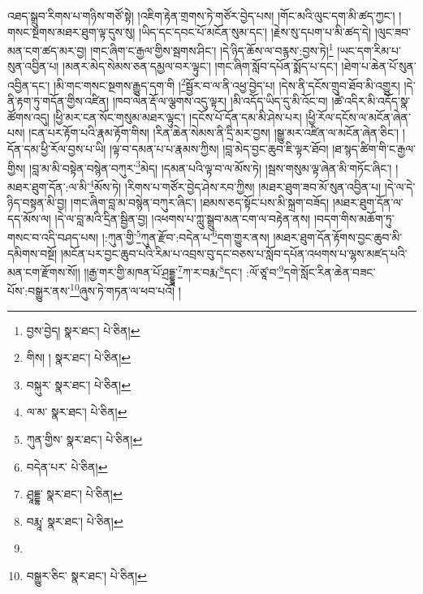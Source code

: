 འཐད་སྒྲུབ་རིགས་པ་གཉིས་གཙོ་སྟེ། །འཇིག་རྟེན་གྲགས་ཏེ་གཙོར་བྱེད་པས། །གོང་མའི་ལུང་དག་མི་ཚད་ཀྱང་། །གསང་སྔགས་མཐར་ཐུག་ལྟ་དུས་སུ། །ཡིད་དང་དབང་པོ་མངོན་སུམ་དང་། །རྗེས་སུ་དཔག་པ་མི་ཚད་དེ། །ལུང་ཟབ་མན་ངག་ཚད་མར་བྱ། །གང་ཞིག་ང་རྒྱལ་གྱིས་སྦགས་ཤིང་། །དེ་ཉིད་ཆོས་ལ་བརྙས་:བྱས་ཏེ།\footnote{བྱས་བྱེད།  སྣར་ཐང་།  པེ་ཅིན། } །ཡང་དག་རིམ་པ་སུན་འབྱིན་པ། །མནར་མེད་སེམས་ཅན་དམྱལ་བར་ལྟུང་། །གང་ཞིག་སློབ་དཔོན་སྨོད་པ་དང་། །ཐེག་པ་ཆེན་པོ་སུན་འབྱིན་དང་། །མི་གང་གསང་སྔགས་རྒྱུད་དག་གི །\footnote{གིས། །  སྣར་ཐང་།  པེ་ཅིན། }སྦྱོར་བ་ལ་ནི་འཕྱ་བྱེད་པ། །དེས་ནི་དངོས་གྲུབ་ཐོབ་མི་འགྱུར། །དེ་ནི་རྟག་ཏུ་གདོན་གྱིས་འཛིན། །ཁབ་ལེན་རྡོ་ལ་ལྕགས་འདུ་ལྟར། །མི་འདོད་ཡིད་དུ་མི་འོང་བ། །ཚེ་འདིར་མི་འདོད་སྣ་ཚོགས་འདུ། །ཕྱི་མར་ངན་སོང་གསུམ་མཐར་ལྟུང་། །དངོས་པོ་དོན་དམ་མི་ཤེས་པར། །ཕྱི་རོལ་དངོས་ལ་མངོན་ཞེན་པས། །ངན་པར་རྟོག་པའི་རྣམ་རྟོག་གིས། །རིན་ཆེན་སེམས་ནི་དྲི་མར་བྱས། །སྒྱུ་མར་འཛིན་ལ་མངོན་ཞེན་ཅིང་། །དོན་དམ་ཕྱི་རོལ་བྱས་པ་ཡི། །ལྟ་བ་དམན་པ་པ་རྣམས་ཀྱིས། །བླ་མེད་བྱང་ཆུབ་ཇི་ལྟར་ཐོབ། །ཐ་སྙད་ཚིག་གི་ང་རྒྱལ་གྱིས། །བླ་མ་མི་བསྟེན་བསྙེན་བཀུར་\footnote{བསྐུར་  སྣར་ཐང་།  པེ་ཅིན། }མེད། །དམན་པའི་ལྟ་བ་ལ་མོས་ཏེ། །སྦས་གསུམ་ལྟ་ཞེན་མི་གཏོང་ཞིང་། །མཐར་ཐུག་དོན་:ལ་མི་\footnote{ལ་མ་  སྣར་ཐང་།  པེ་ཅིན། }མོས་ཏེ། །རིགས་པ་གཙོར་བྱེད་ཤེས་རབ་ཀྱིས། །མཐར་ཐུག་ཟབ་མོ་སུན་འབྱིན་པ། །དེ་ལ་དེ་ཉིད་བསྟན་མི་བྱ། །གང་ཞིག་བླ་མ་བསྙེན་བཀུར་ཞིང་། །ཐམས་ཅད་སྟོང་པས་མི་སྐྲག་བཟོད། །མཐར་ཐུག་དོན་ལ་དད་མོས་ལ། །དེ་ལ་བླ་མའི་དྲིན་སྦྱིན་བྱ། །འཕགས་པ་ཀླུ་སྒྲུབ་མན་ངག་ལ་བརྟེན་ནས། །བདག་གིས་མཆོག་ཏུ་གསང་བ་འདི་བཤད་པས། །:ཀུན་གྱི་\footnote{ཀུན་གྱིས་  སྣར་ཐང་།  པེ་ཅིན། }ཀུན་རྫོབ་:བདེན་པ་\footnote{བདེན་པར་  པེ་ཅིན། }དག་གྱུར་ནས། །མཐར་ཐུག་དོན་རྟོགས་བྱང་ཆུབ་མི་དམིགས་བསྔོ། །མངོན་པར་བྱང་ཆུབ་པའི་རིམ་པ་འབྲས་བུ་དང་བཅས་པ་སློབ་དཔོན་འཕགས་པ་ལྷས་མཛད་པའི་མན་ངག་རྫོགས་སོ།། །།རྒྱ་གར་གྱི་མཁན་པོ་ཤྲདྡྷཱ་\footnote{ཤྲཱདྡྷ་  སྣར་ཐང་།  པེ་ཅིན། }ཀ་ར་བརྨ་\footnote{བརྨཱ་  སྣར་ཐང་།  པེ་ཅིན། }དང་། :ལོ་ཙཱ་བ་\footnote{}དགེ་སློང་རིན་ཆེན་བཟང་པོས་:བསྒྱུར་ནས་\footnote{བསྒྱུར་ཅིང་  སྣར་ཐང་།  པེ་ཅིན། }ཞུས་ཏེ་གཏན་ལ་ཕབ་པའོ། ། 